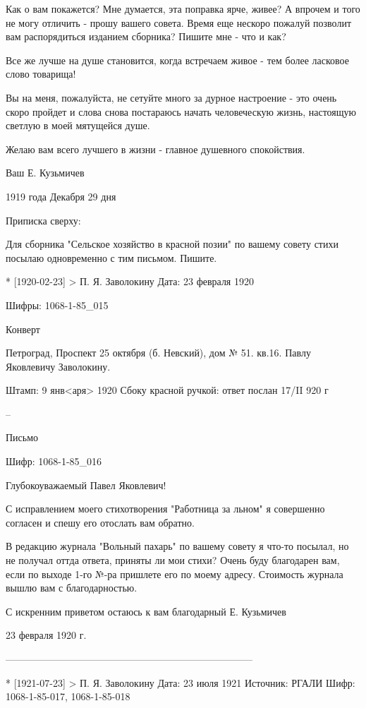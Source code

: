 Как о вам покажется? Мне думается, эта поправка ярче, живее? А впрочем и того не могу отличить - прошу вашего совета. Время еще нескоро пожалуй позволит вам распорядиться изданием сборника? Пишите мне - что и как?

Все же лучше на душе становится, когда встречаем живое - тем более ласковое слово товарища!

Вы на меня, пожалуйста, не сетуйте много за дурное настроение - это очень скоро пройдет и слова снова постараюсь начать человеческую жизнь, настоящую светлую в моей мятущейся душе.

Желаю вам всего лучшего в жизни - главное душевного спокойствия.

Ваш Е. Кузьмичев

1919 года Декабря 29 дня

Приписка сверху:

Для сборника "Сельское хозяйство в красной позии" по вашему совету стихи посылаю одновременно с тим письмом. Пишите.






* [1920-02-23] > П. Я. Заволокину 
Дата: 23 февраля 1920

Шифры:  1068-1-85_015

Конверт

Петроград, Проспект 25 октября (б. Невский), дом № 51. кв.16. Павлу Яковлевичу Заволокину.

Штамп: 9 янв<аря> 1920
Сбоку красной ручкой: ответ послан 17/II 920 г

--

Письмо

Шифр: 1068-1-85_016

Глубокоуважаемый Павел Яковлевич!

С исправлением моего стихотворения "Работница за льном" я совершенно согласен и спешу его отослать вам обратно.

В редакцию журнала "Вольный пахарь" по вашему совету я что-то посылал, но не получал оттда ответа, приняты ли мои стихи? Очень буду благодарен вам, если по выходе 1-го №-ра пришлете его по моему адресу. Стоимость журнала вышлю вам с благодарностью.

С искренним приветом остаюсь к вам благодарный Е. Кузьмичев

23 февраля 1920 г.

---------------------------------------------------------------------------

* [1921-07-23] > П. Я. Заволокину 
Дата: 23 июля 1921
Источник: РГАЛИ
Шифр: 1068-1-85-017, 1068-1-85-018

